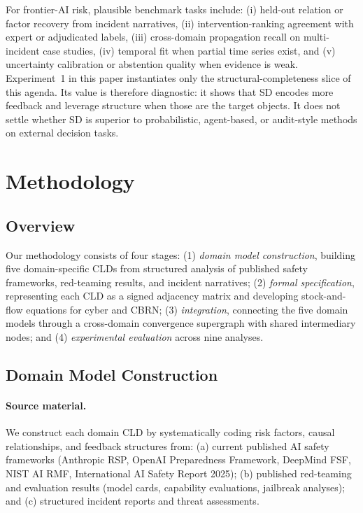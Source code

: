 \documentclass[11pt]{article}
\begin{document}
For frontier-AI risk, plausible benchmark tasks include: (i) held-out relation or factor recovery from incident narratives, (ii) intervention-ranking agreement with expert or adjudicated labels, (iii) cross-domain propagation recall on multi-incident case studies, (iv) temporal fit when partial time series exist, and (v) uncertainty calibration or abstention quality when evidence is weak. Experiment~1 in this paper instantiates only the structural-completeness slice of this agenda. Its value is therefore diagnostic: it shows that SD encodes more feedback and leverage structure when those are the target objects. It does not settle whether SD is superior to probabilistic, agent-based, or audit-style methods on external decision tasks.

\section{Methodology}
\label{sec:methodology}

\subsection{Overview}

Our methodology consists of four stages: (1) \textit{domain model construction}, building five domain-specific CLDs from structured analysis of published safety frameworks, red-teaming results, and incident narratives; (2) \textit{formal specification}, representing each CLD as a signed adjacency matrix and developing stock-and-flow equations for cyber and CBRN; (3) \textit{integration}, connecting the five domain models through a cross-domain convergence supergraph with shared intermediary nodes; and (4) \textit{experimental evaluation} across nine analyses.

\subsection{Domain Model Construction}
\label{sec:construction}

\paragraph{Source material.} We construct each domain CLD by systematically coding risk factors, causal relationships, and feedback structures from: (a) current published AI safety frameworks (Anthropic RSP, OpenAI Preparedness Framework, DeepMind FSF, NIST AI RMF, International AI Safety Report 2025); (b) published red-teaming and evaluation results (model cards, capability evaluations, jailbreak analyses); and (c) structured incident reports and threat assessments.
\end{document}
